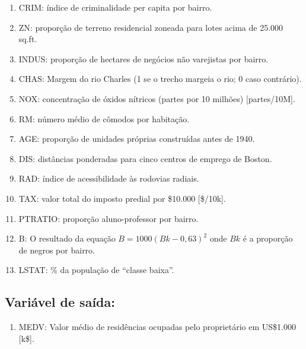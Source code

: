 \documentclass[
  letterpaper,
]{report}
\providecommand{\tightlist}{%
  \setlength{\itemsep}{0pt}\setlength{\parskip}{0pt}}\usepackage{longtable,booktabs,array}
\begin{document}
\begin{enumerate}
\def\labelenumi{\arabic{enumi})}
\tightlist
\item
  CRIM: índice de criminalidade per capita por bairro.\\
\item
  ZN: proporção de terreno residencial zoneada para lotes acima de
  25.000 sq.ft.\\
\item
  INDUS: proporção de hectares de negócios não varejistas por bairro.\\
\item
  CHAS: Margem do rio Charles (1 se o trecho margeia o rio; 0 caso
  contrário).\\
\item
  NOX: concentração de óxidos nítricos (partes por 10 milhões)
  {[}partes/10M{]}.\\
\item
  RM: número médio de cômodos por habitação.\\
\item
  AGE: proporção de unidades próprias construídas antes de 1940.\\
\item
  DIS: distâncias ponderadas para cinco centros de emprego de Boston.\\
\item
  RAD: índice de acessibilidade às rodovias radiais.\\
\item
  TAX: valor total do imposto predial por \$10.000 {[}\$/10k{]}.\\
\item
  PTRATIO: proporção aluno-professor por bairro.\\
\item
  B: O resultado da equação \(B=1000(Bk - 0,63)^2\) onde \(Bk\) é a
  proporção de negros por bairro.\\
\item
  LSTAT: \% da população de ``classe baixa''.\\
\end{enumerate}

\hypertarget{variuxe1vel-de-sauxedda}{%
\subsection{Variável de saída:}\label{variuxe1vel-de-sauxedda}}

\begin{enumerate}
\def\labelenumi{\arabic{enumi})}
\tightlist
\item
  MEDV: Valor médio de residências ocupadas pelo proprietário em
  US\$1.000 {[}k\${]}.
\end{enumerate}
\end{document}
